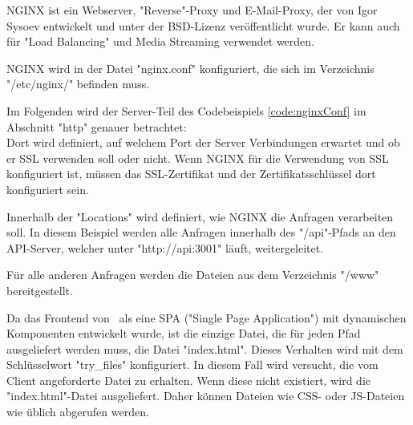 

NGINX ist ein Webserver, "Reverse"-Proxy und E-Mail-Proxy, der von Igor Sysoev entwickelt und unter der BSD-Lizenz veröffentlicht wurde. 
Er kann auch für "Load Balancing" und Media Streaming verwendet werden.
\cite{WikiNginx}
\cite{nginx}

NGINX wird in der Datei "nginx.conf" konfiguriert, die sich im Verzeichnis \linebreak \mbox{\ttfamily "/etc/nginx/"} befinden muss. 


Im Folgenden wird der Server-Teil des Codebeispiels \ref{code:nginxConf} im Abschnitt "{\ttfamily http}" genauer betrachtet: \\
Dort wird definiert, auf welchem Port der Server Verbindungen erwartet und ob er SSL verwenden soll oder nicht. 
Wenn NGINX für die Verwendung von SSL konfiguriert ist, müssen das SSL-Zertifikat und der Zertifikatsschlüssel dort konfiguriert sein.

Innerhalb der "Locations" wird definiert, wie NGINX die Anfragen verarbeiten soll. In diesem Beispiel werden alle Anfragen innerhalb des "{\ttfamily /api}"-Pfads an den API-Server, welcher unter \mbox{"{\ttfamily http://api:3001}"} läuft, weitergeleitet.

Für alle anderen Anfragen werden die Dateien aus dem Verzeichnis "{\ttfamily /www}" bereitgestellt. 

Da das Frontend von \ZELIA\ als eine SPA ("Single Page Application") mit dynamischen Komponenten entwickelt wurde, ist die einzige Datei, die für jeden Pfad ausgeliefert werden muss, die Datei "{\ttfamily index.html}". 
Dieses Verhalten wird mit dem Schlüsselwort "{\ttfamily try\_files}" konfiguriert. 
In diesem Fall wird versucht, die vom Client angeforderte Datei zu erhalten. 
Wenn diese nicht existiert, wird die "{\ttfamily index.html}"-Datei ausgeliefert. 
Daher können Dateien wie CSS- oder JS-Dateien wie üblich abgerufen werden.

